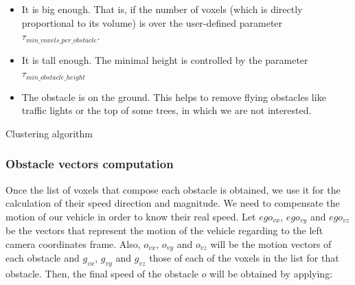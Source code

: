 \begin{itemize}
 \item It is big enough. That is, if the number of voxels (which is directly proportional to its volume) is over the user-defined parameter $\tau_{min\_voxels\_per\_obstacle}$.
 \item It is tall enough. The minimal height is controlled by the parameter\\ $\tau_{min\_obstacle\_height}$
 \item The obstacle is on the ground. This helps to remove flying obstacles like traffic lights or the top of some trees, in which we are not interested.
\end{itemize}

\begin{algorithm*}[h!]
\caption{Clustering algorithm}
\label{alg:cp05_clustering}
\begin{algorithmic}
 
      \EndIf
    \EndFor
  \EndWhile
  \EndIf
\EndFor
\EndFunction
\end{algorithmic}
\end{algorithm*}


\subsubsection{Obstacle vectors computation}\label{ch:chapter05_01_05_01}

Once the list of voxels that compose each obstacle is obtained, we use it for the calculation of their speed direction and magnitude. We need to compensate the motion of our vehicle in order to know their real speed. Let $ego_{vx}$, $ego_{vy}$ and $ego_{vz}$ be the vectors that represent the motion of the vehicle regarding to the left camera coordinates frame. Also, $o_{vx}$, $o_{vy}$ and $o_{vz}$ will be the motion vectors of each obstacle and $g_{vx}$, $g_{vy}$ and $g_{vz}$ those of each of the voxels in the list for that obstacle. Then, the final speed of the obstacle $o$ will be obtained by applying:

